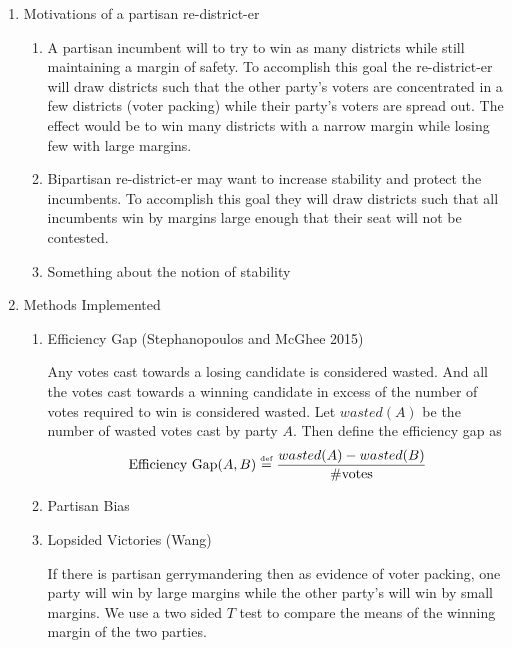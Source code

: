 \documentclass[10pt]{article}
\theoremstyle{definition}
\theoremstyle{remark}
\def\defeq{\stackrel{\text{\tiny def}}=}
\begin{document}
\begin{enumerate}

    \item Motivations of a partisan re-district-er
    \begin{enumerate}

        \item A partisan incumbent will to try to win as many districts while
        still maintaining a margin of safety. To accomplish this goal the
        re-district-er will draw districts such that the other party's voters
        are concentrated in a few districts (voter packing) while their party's
        voters are spread out. The effect would be to win many districts with a
        narrow margin while losing few with large margins.


        \item Bipartisan re-district-er may want to increase stability and
        protect the incumbents. To accomplish this goal they will draw districts
        such that all incumbents win by margins large enough that their seat
        will not be contested.

        \item Something about the notion of stability

    \end{enumerate}

    \item Methods Implemented
    \begin{enumerate}
        \item Efficiency Gap (Stephanopoulos and McGhee 2015)

        Any votes cast towards a losing candidate is considered wasted. And
        all the votes cast towards a winning candidate in excess of the number
        of votes required to win is considered wasted.
        Let $wasted(A)$ be the number of wasted votes cast by party $A$.
        Then define the efficiency gap as
        $$
        \text{ Efficiency Gap}(A,B)\defeq \frac{wasted(A)-wasted(B)}{
        \#\text{votes}
        }
        $$

        \item Partisan Bias

        \item Lopsided Victories (Wang)

        If there is partisan gerrymandering then as evidence of voter packing,
        one party will win by large margins while the other party's
        will win by small margins. We use a two sided $T$ test to compare the
        means of the winning margin of the two parties.


\end{enumerate}
\end{enumerate}
\end{document}
